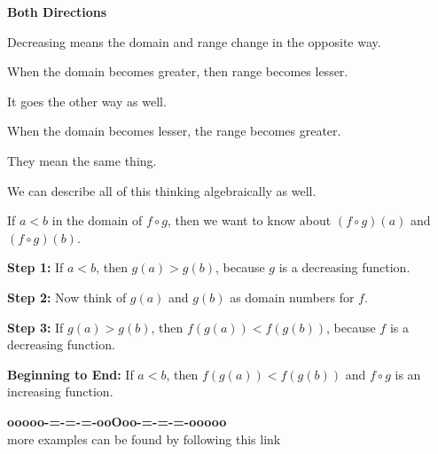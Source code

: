 \documentclass{ximera}
\begin{document}
\begin{warning} \textbf{\textcolor{red!70!black}{Both Directions}}

Decreasing means the domain and range change in the opposite way.

When the domain becomes greater, then range becomes lesser.

It goes the other way as well.

When the domain becomes lesser, the range becomes greater.

They mean the same thing.


\end{warning}






We can describe all of this thinking algebraically as well. 


If $a < b$ in the domain of $f \circ g$, then we want to know about $(f \circ g)(a)$  and $(f \circ g)(b)$.



\textbf{Step 1:}  If $a < b$, then $g(a) > g(b)$, because $g$ is a decreasing function.


\textbf{Step 2:}  Now think of $g(a)$ and $g(b)$ as domain numbers for $f$.


\textbf{Step 3:}  If $g(a) > g(b)$, then $f(g(a)) < f(g(b))$, because $f$ is a decreasing function.


\textbf{Beginning to End:} If $a < b$, then $f(g(a)) < f(g(b))$ and $f \circ g$ is an increasing function.







































\begin{center}
\textbf{\textcolor{green!50!black}{ooooo-=-=-=-ooOoo-=-=-=-ooooo}} \\

more examples can be found by following this link\\ 

\end{center}
\end{document}
